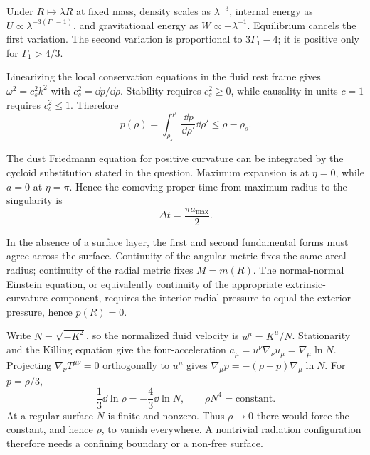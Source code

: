 \begin{solutions}
\begin{solution}
Under \(R\mapsto\lambda R\) at fixed mass, density scales as
\(\lambda^{-3}\), internal energy as
\(U\propto\lambda^{-3(\Gamma_1-1)}\), and gravitational energy as
\(W\propto-\lambda^{-1}\).  Equilibrium cancels the first variation.
The second variation is proportional to \(3\Gamma_1-4\); it is positive only
for \(\Gamma_1>4/3\).
\end{solution}

\begin{solution}
Linearizing the local conservation equations in the fluid rest frame gives
\(\omega^2=c_s^2k^2\) with \(c_s^2=\dd p/\dd\rho\).  Stability requires
\(c_s^2\geq0\), while causality in units \(c=1\) requires \(c_s^2\leq1\).
Therefore
\[
p(\rho)=\int_{\rho_s}^{\rho}\frac{\dd p}{\dd\rho'}\dd\rho'
\leq\rho-\rho_s.
\]
\end{solution}

\begin{solution}
The dust Friedmann equation for positive curvature can be integrated by the
cycloid substitution stated in the question.  Maximum expansion is at
\(\eta=0\), while \(a=0\) at \(\eta=\pi\).  Hence the comoving proper time
from maximum radius to the singularity is
\[
\Delta t=\frac{\pi a_{\max}}2.
\]
\end{solution}

\begin{solution}
In the absence of a surface layer, the first and second fundamental forms
must agree across the surface.  Continuity of the angular metric fixes the
same areal radius; continuity of the radial metric fixes
\(M=m(R)\).  The normal-normal Einstein equation, or equivalently continuity
of the appropriate extrinsic-curvature component, requires the interior
radial pressure to equal the exterior pressure, hence \(p(R)=0\).
\end{solution}

\begin{solution}
Write \(N=\sqrt{-K^2}\), so the normalized fluid velocity is
\(u^\mu=K^\mu/N\).  Stationarity and the Killing equation give the
four-acceleration
\(a_\mu=u^\nu\nabla_\nu u_\mu=\nabla_\mu\ln N\).  Projecting
\(\nabla_\nu T^{\mu\nu}=0\) orthogonally to \(u^\mu\) gives
\(\nabla_\mu p=-(\rho+p)\nabla_\mu\ln N\).
For \(p=\rho/3\),
\[
\frac13\dd\ln\rho=-\frac43\dd\ln N,
\qquad
\rho N^4=\text{constant}.
\]
At a regular surface \(N\) is finite and nonzero.  Thus \(\rho\to0\) there
would force the constant, and hence \(\rho\), to vanish everywhere.  A
nontrivial radiation configuration therefore needs a confining boundary or
a non-free surface.
\end{solution}



\end{solutions}
